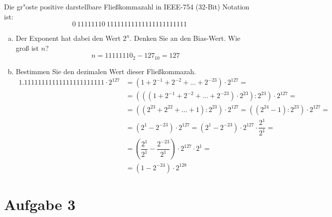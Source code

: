 \documentclass[10pt, oneside]{article}
\begin{document}
Die gr"oste positive darstellbare Flie{\ss}kommazahl in IEEE-754 (32-Bit) Notation ist:
\begin{equation*}
    0\ 11111110\ 11111111111111111111111
\end{equation*}
\begin{enumerate}[(a)]
    \item Der Exponent hat dabei den Wert $2^n$. Denken Sie an den Bias-Wert.
        Wie gro{\ss} ist $n$?
        \begin{equation*}
            n = 11111110_2 - 127_{10} = 127
        \end{equation*}
    \item Bestimmen Sie den dezimalen Wert dieser Fließkommazah.
        \begin{align*}
            1.11111111111111111111111 \cdot 2^{127} &=   (1 + 2^{-1} + 2^{-2} + ... + 2^{-23}) \cdot 2^{127} = \\
                                                    &= (((1 + 2^{-1} + 2^{-2} + ... + 2^{-23}) \cdot 2^{23}) : 2^{23}) \cdot 2^{127} = \\
                                                    &=  ((2^{23} + 2^{22} + ... + 1) : 2^{23}) \cdot 2^{127} = ((2^{24} - 1) : 2^{23}) \cdot 2^{127} = \\
                                                    &=   (2^1 - 2^{-23}) \cdot 2^{127} = (2^1 - 2^{-23}) \cdot 2^{127} \cdot \dfrac{2^{1}}{2^{1}} = \\
                                                    &=   (\dfrac{2^1}{2^1} - \dfrac{2^{-23}}{2^1}) \cdot 2^{127} \cdot 2^1 = \\[5pt]
                                                    &=   (1 - 2^{-24}) \cdot 2^{128}
        \end{align*}
\end{enumerate}

\section{Aufgabe 3}
\end{document}
